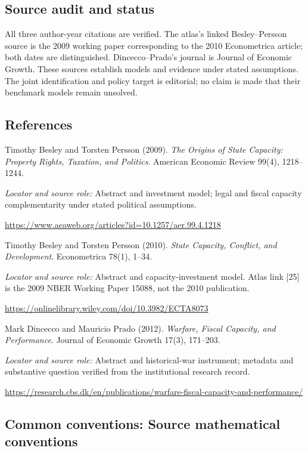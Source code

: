 \documentclass[11pt,a4paper]{article}
\begin{document}
\subsection*{Source audit and status}
All three author-year citations are verified. The atlas's linked Besley--Persson source is the 2009 working paper corresponding to the 2010 Econometrica article; both dates are distinguished. Dincecco--Prado's journal is Journal of Economic Growth. These sources establish models and evidence under stated assumptions. The joint identification and policy target is editorial; no claim is made that their benchmark models remain unsolved.
\subsection*{References}
{\footnotesize\raggedright
\begin{enumerate}[label={\textbf{[S\arabic*]}},leftmargin=3em]
\item Timothy Besley and Torsten Persson (2009). \emph{The Origins of State Capacity: Property Rights, Taxation, and Politics}. American Economic Review 99(4), 1218--1244.\par
\textit{Locator and source role:} Abstract and investment model; legal and fiscal capacity complementarity under stated political assumptions.\par
\url{https://www.aeaweb.org/articles?id=10.1257/aer.99.4.1218}
\item Timothy Besley and Torsten Persson (2010). \emph{State Capacity, Conflict, and Development}. Econometrica 78(1), 1--34.\par
\textit{Locator and source role:} Abstract and capacity-investment model. Atlas link [25] is the 2009 NBER Working Paper 15088, not the 2010 publication.\par
\url{https://onlinelibrary.wiley.com/doi/10.3982/ECTA8073}
\item Mark Dincecco and Mauricio Prado (2012). \emph{Warfare, Fiscal Capacity, and Performance}. Journal of Economic Growth 17(3), 171--203.\par
\textit{Locator and source role:} Abstract and historical-war instrument; metadata and substantive question verified from the institutional research record.\par
\url{https://research.cbs.dk/en/publications/warfare-fiscal-capacity-and-performance/}
\end{enumerate}
}

\subsection*{Common conventions: Source mathematical conventions}
\end{document}

